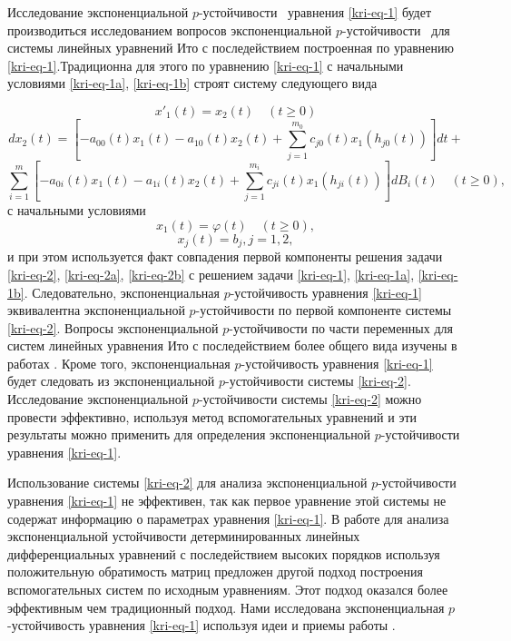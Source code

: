 Исследование экспоненциальной  $p${}-устойчивости \ уравнения \eqref{kri-eq-1} будет производиться исследованием вопросов
экспоненциальной  $p${}-устойчивости \ для системы линейных уравнений Ито с последействием построенная по уравнению
\eqref{kri-eq-1}.Традиционна для этого по уравнению \eqref{kri-eq-1} с начальными условиями \eqref{kri-eq-1a}, \eqref{kri-eq-1b} строят систему следующего вида

\begin{equation*}
	x'_1(t) = x_2(t)\quad(t\ge0)
\end{equation*}
\begin{equation}\label{kri-eq-2}
	dx_2(t) = \left[-a_{00}(t)x_1(t) - a_{10}(t)x_2(t) + \sum_{j=1}^{m_0}c_{j0}(t)x_1(h_{j0}(t))\right]dt +
\end{equation}
\begin{equation*}
	\sum_{i=1}^{m} \left[-a_{0i}(t)x_1(t)-a_{1i}(t)x_2(t)+\sum_{j=1}^{m_i}c_{ji}(t)x_1(h_{ji}(t))\right]dB_i(t) \quad (t \ge 0),
\end{equation*}
с начальными условиями
\begin{equation}\label{kri-eq-2a}
	x_1(t)=\varphi (t)\quad(t\ge 0),
\end{equation}
\begin{equation}\label{kri-eq-2b}
	x_j(t)=b_j, j=1,2,
\end{equation}
и при этом используется факт совпадения первой компоненты решения задачи \eqref{kri-eq-2}, \eqref{kri-eq-2a}, \eqref{kri-eq-2b} с решением задачи \eqref{kri-eq-1}, \eqref{kri-eq-1a},
\eqref{kri-eq-1b}. Следовательно, экспоненциальная  $p$-\linebreak устойчивость уравнения \eqref{kri-eq-1} эквивалентна экспоненциальной
$p${}-устойчивости по первой компоненте системы \eqref{kri-eq-2}. Вопросы экспоненциальной  $p${}-устойчивости по части переменных
для систем линейных уравнения Ито с последействием более общего вида изучены в работах \cite{kri-bib-19, kri-bib-20}. Кроме того,
экспоненциальная  $p${}-устойчивость уравнения \eqref{kri-eq-1} будет следовать из экспоненциальной  $p${}-устойчивости системы \eqref{kri-eq-2}.
Исследование экспоненциальной  $p${}-устойчивости системы \eqref{kri-eq-2} можно провести эффективно, используя метод
вспомогательных уравнений и эти результаты можно применить для определения экспоненциальной  $p${}-устойчивости
уравнения \eqref{kri-eq-1}.

Использование системы \eqref{kri-eq-2} для анализа экспоненциальной  $p${}-устойчивости уравнения \eqref{kri-eq-1} не эффективен, так как первое
уравнение этой системы не содержат информацию о параметрах уравнения \eqref{kri-eq-1}. В работе \cite{kri-bib-16} для анализа экспоненциальной
устойчивости детерминированных линейных дифференциальных уравнений с последействием высоких порядков используя
положительную обратимость матриц предложен другой подход построения вспомогательных систем по исходным уравнениям. Этот
подход оказался более эффективным чем традиционный подход. Нами исследована экспоненциальная  $p${}-устойчивость
уравнения \eqref{kri-eq-1} используя идеи и приемы работы \cite{kri-bib-16}.

